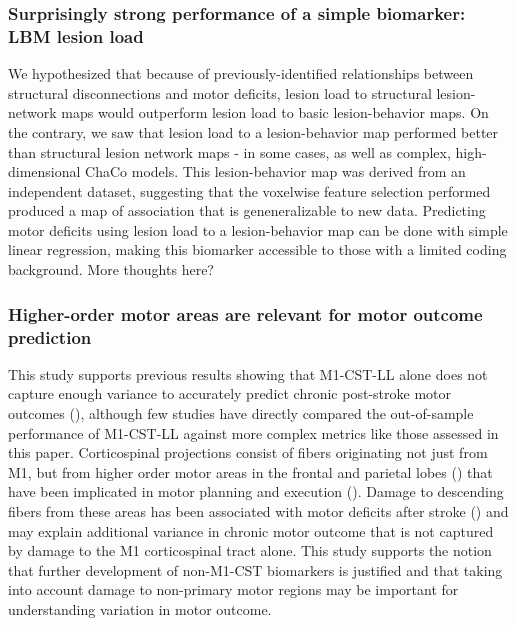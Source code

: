 \documentclass[10pt]{article}
\newcommand{\colorNavyBlue}[1]{\textcolor{NavyBlue}{#1}}
\begin{document}
\subsubsection*{Surprisingly strong performance of a simple biomarker: LBM lesion load}
We hypothesized that because of previously-identified relationships between structural disconnections and motor deficits, lesion load to structural lesion-network maps would outperform lesion load to basic lesion-behavior maps. On the contrary, we saw that lesion load to a lesion-behavior map performed better than structural lesion network maps - in some cases, as well as complex, high-dimensional ChaCo models. This lesion-behavior map was derived from an independent dataset, suggesting that the voxelwise feature selection performed produced a map of association that is geneneralizable to new data. Predicting motor deficits using lesion load to a lesion-behavior map can be done with simple linear regression, making this biomarker accessible to those with a limited coding background. \colorNavyBlue{More thoughts here? }

\subsubsection*{Higher-order motor areas are relevant for motor outcome prediction}
This study supports previous results showing that M1-CST-LL alone does not capture enough variance to accurately predict chronic post-stroke motor outcomes (\cite{Rondina2017-ij, Park2016-te, Ito2022-em}), although few studies have directly compared the out-of-sample performance of M1-CST-LL against more complex metrics like those assessed in this paper. Corticospinal projections consist of fibers originating not just from M1, but from higher order motor areas in the frontal and parietal lobes (\cite{Galea1994-yi}) that have been implicated in motor planning and execution (\cite{Ball1999-yo}). Damage to descending fibers from these areas has been associated with motor deficits after stroke (\cite{Ito2022-em, Riley2011-xo}) and may explain additional variance in chronic motor outcome that is not captured by damage to the M1 corticospinal tract alone. This study supports the notion that further development of non-M1-CST biomarkers is justified and that taking into account damage to non-primary motor regions may be important for understanding variation in motor outcome.
\end{document}

